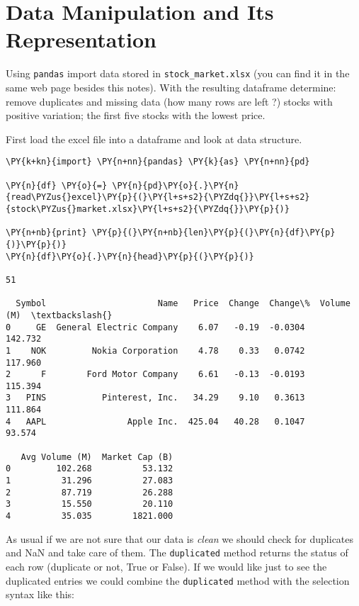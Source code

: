 \chapter{Data Manipulation and Its Representation}\label{introduction-to-python---lesson-5}

\begin{Exercise}
Using \texttt{pandas} import data stored in \texttt{stock\_market.xlsx} (you can find it in the same web page besides this notes). With the resulting dataframe determine:
\Question remove duplicates and missing data (how many rows are left ?)
\Question stocks with positive variation;
\Question the first five stocks with the lowest price.
\end{Exercise}

\begin{Answer}
  \Question
First load the excel file into a dataframe and look at data structure.

\begin{tcolorbox}[size=fbox, boxrule=1pt, colback=cellbackground, colframe=cellborder]
\begin{Verbatim}[commandchars=\\\{\}]
\PY{k+kn}{import} \PY{n+nn}{pandas} \PY{k}{as} \PY{n+nn}{pd}

\PY{n}{df} \PY{o}{=} \PY{n}{pd}\PY{o}{.}\PY{n}{read\PYZus{}excel}\PY{p}{(}\PY{l+s+s2}{\PYZdq{}}\PY{l+s+s2}{stock\PYZus{}market.xlsx}\PY{l+s+s2}{\PYZdq{}}\PY{p}{)}

\PY{n+nb}{print} \PY{p}{(}\PY{n+nb}{len}\PY{p}{(}\PY{n}{df}\PY{p}{)}\PY{p}{)}
\PY{n}{df}\PY{o}{.}\PY{n}{head}\PY{p}{(}\PY{p}{)}

51

  Symbol                      Name   Price  Change  Change\%  Volume (M)  \textbackslash{}
0     GE  General Electric Company    6.07   -0.19  -0.0304     142.732
1    NOK         Nokia Corporation    4.78    0.33   0.0742     117.960
2      F        Ford Motor Company    6.61   -0.13  -0.0193     115.394
3   PINS           Pinterest, Inc.   34.29    9.10   0.3613     111.864
4   AAPL                Apple Inc.  425.04   40.28   0.1047      93.574

   Avg Volume (M)  Market Cap (B)
0         102.268          53.132
1          31.296          27.083
2          87.719          26.288
3          15.550          20.110
4          35.035        1821.000
\end{Verbatim}
\end{tcolorbox}
        
As usual if we are not sure that our data is \emph{clean} we should check for duplicates and NaN and take care of them. The \texttt{duplicated} method returns the status of each row (duplicate or not, True or False). If we would like just to see the duplicated entries we could combine the \texttt{duplicated} method with the selection syntax like this:


\end{Answer}
